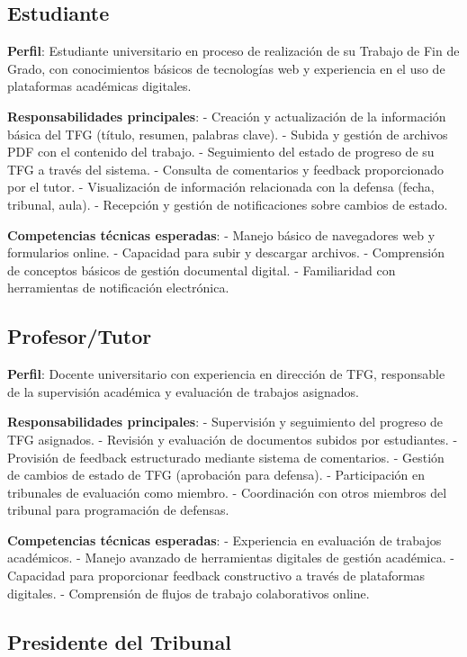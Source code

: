 \documentclass[12pt,a4paper,oneside]{report}
\begin{document}
\subsection{Estudiante}\label{estudiante}

\textbf{Perfil}: Estudiante universitario en proceso de realización de
su Trabajo de Fin de Grado, con conocimientos básicos de tecnologías web
y experiencia en el uso de plataformas académicas digitales.

\textbf{Responsabilidades principales}: - Creación y actualización de la
información básica del TFG (título, resumen, palabras clave). - Subida y
gestión de archivos PDF con el contenido del trabajo. - Seguimiento del
estado de progreso de su TFG a través del sistema. - Consulta de
comentarios y feedback proporcionado por el tutor. - Visualización de
información relacionada con la defensa (fecha, tribunal, aula). -
Recepción y gestión de notificaciones sobre cambios de estado.

\textbf{Competencias técnicas esperadas}: - Manejo básico de navegadores
web y formularios online. - Capacidad para subir y descargar archivos. -
Comprensión de conceptos básicos de gestión documental digital. -
Familiaridad con herramientas de notificación electrónica.

\subsection{Profesor/Tutor}\label{profesortutor}

\textbf{Perfil}: Docente universitario con experiencia en dirección de
TFG, responsable de la supervisión académica y evaluación de trabajos
asignados.

\textbf{Responsabilidades principales}: - Supervisión y seguimiento del
progreso de TFG asignados. - Revisión y evaluación de documentos subidos
por estudiantes. - Provisión de feedback estructurado mediante sistema
de comentarios. - Gestión de cambios de estado de TFG (aprobación para
defensa). - Participación en tribunales de evaluación como miembro. -
Coordinación con otros miembros del tribunal para programación de
defensas.

\textbf{Competencias técnicas esperadas}: - Experiencia en evaluación de
trabajos académicos. - Manejo avanzado de herramientas digitales de
gestión académica. - Capacidad para proporcionar feedback constructivo a
través de plataformas digitales. - Comprensión de flujos de trabajo
colaborativos online.

\subsection{Presidente del Tribunal}\label{presidente-del-tribunal}
\end{document}
